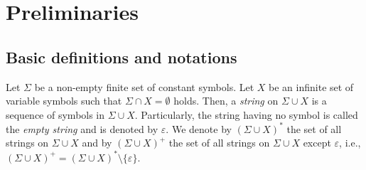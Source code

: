 \section{Preliminaries}

\subsection{Basic definitions and notations}\label{subsec:basicdef}

Let $\Sigma$ be a non-empty finite set of constant symbols.
Let $X$ be an infinite set of variable symbols such that $\Sigma \cap X = \emptyset$ holds.
Then, a \textit{string} on $\Sigma \cup X$ is a sequence of symbols in $\Sigma \cup X$.
Particularly, the string having no symbol is called the \textit{empty string} and is denoted by $\varepsilon$.
We denote by $(\Sigma \cup X)^{\ast}$ the set of all strings on $\Sigma \cup X$ 
and by $(\Sigma \cup X)^{+}$ the set of all strings on $\Sigma\cup X$ except $\varepsilon$, i.e., $(\Sigma \cup X)^{+}=(\Sigma \cup X)^{\ast}\setminus \{\varepsilon\}$.

